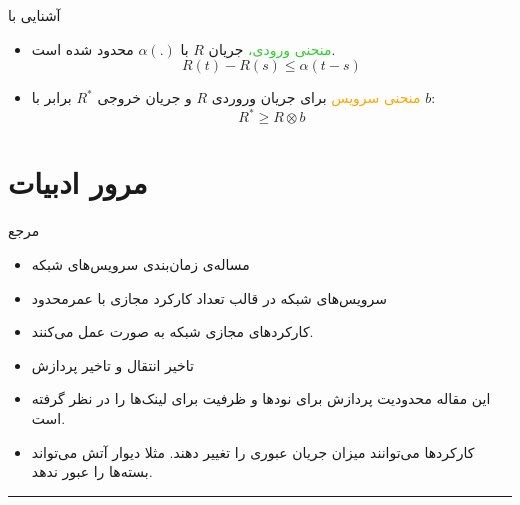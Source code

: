 \documentclass[dvipsnames]{beamer}
\makeatletter
\newcommand{\RTList}{\raggedleft\rightskip\@totalleftmargin}
\makeatother
\begin{document}
\begin{persian}
	\begin{frame}{آشنایی با }
		\begin{itemize}\RTList{}
			\justifying%
		  \item \textcolor{LimeGreen}{منحنی ورودی،}
				جریان \(R\) با \( \alpha(.) \) محدود شده است.
			\[ R(t) - R(s) \le \alpha(t - s) \]
		  \item \textcolor{Orange}{منحنی سرویس}
				برای جریان وروردی \(R\) و جریان خروجی \(R^{*}\) برابر با \(b\):
			\[ R^{*} \ge R \otimes b \]
		\end{itemize}
	\end{frame}

	\section{مرور ادبیات}

	\begin{frame}{مرجع~\cite{Qu2016}}
		\begin{itemize}\RTList{}
			\justifying%
			\item مساله‌ی زمان‌بندی سرویس‌های شبکه
			\item سرویس‌های شبکه در قالب تعداد کارکرد مجازی با عمرمحدود
			\item کارکردهای مجازی شبکه به صورت  عمل می‌کنند.
			\item تاخیر انتقال و تاخیر پردازش
			\item این مقاله محدودیت پردازش برای نودها و ظرفیت برای لینک‌ها را در نظر گرفته است.
			\item کارکردها می‌توانند میزان جریان عبوری را تغییر دهند. مثلا دیوار آتش می‌تواند بسته‌ها را عبور ندهد.
		\end{itemize}
		\begin{latin}
		\noindent\rule{1cm}{0.4pt}\\
		\scriptsize{}
		\end{latin}
	\end{frame}


\end{persian}
\end{document}
